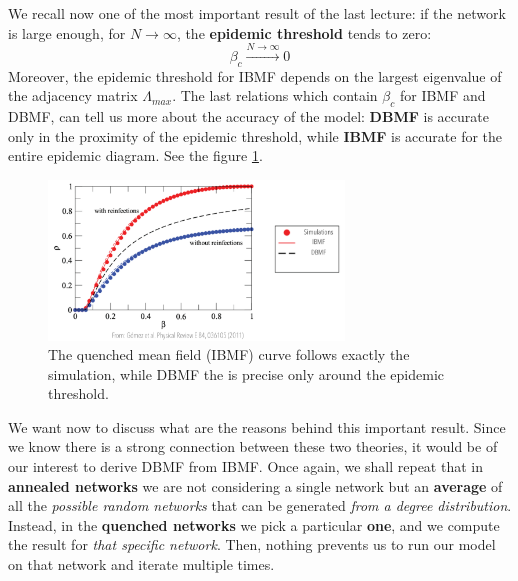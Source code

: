 \documentclass[../main/main.tex]{subfiles}
\begin{document}
We recall now one of the most important result of the last lecture: if the network is large enough, for \( N \rightarrow \infty  \), the \textbf{epidemic threshold} tends to zero:
\begin{equation}
    \beta_c \xrightarrow{N \to \infty} 0
\end{equation}
Moreover, the epidemic threshold for IBMF depends on the largest eigenvalue of the adjacency matrix $\Lambda_{max}$.
The last relations which contain \( \beta _c \) for IBMF and DBMF, can tell us more about the accuracy of the model: \textbf{DBMF} is accurate only in the proximity of the epidemic threshold, while \textbf{IBMF} is accurate for the entire epidemic diagram. See the figure \ref{fig:09_3}.

\begin{figure}[h!]
\centering
\includegraphics[width=0.7\textwidth]{../lessons/image/09/3.png}
\caption{\label{fig:09_3} The quenched mean field (IBMF) curve follows exactly the simulation, while DBMF the is precise only around the epidemic threshold.}
\end{figure}

We want now to discuss what are the reasons behind this important result. Since we know there is a strong connection between these two theories, it would be of our interest to derive DBMF from IBMF. Once again, we shall repeat that in \textbf{annealed networks} we are not considering a single network but an \textbf{average} of all the \textit{possible random networks} that can be generated \textit{from a degree distribution}. Instead, in the \textbf{quenched networks} we pick a particular \textbf{one}, and we compute the result for \textit{that specific network}. Then, nothing prevents us to run our model on that network and iterate multiple times.
\end{document}
